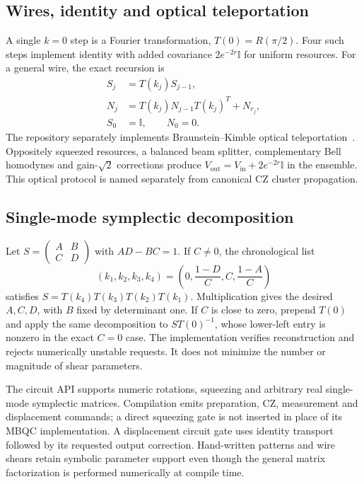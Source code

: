 \documentclass[a4paper,twocolumn,11pt,nopdfoutputerror]{quantumarticle}
\newcommand{\I}{\mathbb{I}}
\begin{document}
\subsection{Wires, identity and optical teleportation}

A single $k=0$ step is a Fourier transformation, $T(0)=R(\pi/2)$.
Four such steps implement identity with added covariance $2e^{-2r}\I$ for
uniform resources. For a general wire, the exact recursion is
\begin{align}
 S_j&=T(k_j)S_{j-1},\\
 N_j&=T(k_j)N_{j-1}T(k_j)^T+N_{r_j},\\
 S_0&=\I,\qquad N_0=0.
 \label{eq:noise}
\end{align}
The repository separately implements Braunstein--Kimble optical
teleportation~\cite{bk1998}. Oppositely squeezed resources, a balanced beam
splitter, complementary Bell homodynes and gain-$\sqrt2$ corrections produce
$V_{\mathrm{out}}=V_{\mathrm{in}}+2e^{-2r}\I$ in the ensemble. This optical
protocol is named separately from canonical CZ cluster propagation.

\subsection{Single-mode symplectic decomposition}

Let $S=\left(\begin{smallmatrix}A&B\\C&D\end{smallmatrix}\right)$ with
$AD-BC=1$. If $C\ne0$, the chronological list
\begin{equation}
 (k_1,k_2,k_3,k_4)=\left(0,\frac{1-D}{C},C,\frac{1-A}{C}\right)
 \label{eq:decomp}
\end{equation}
satisfies $S=T(k_4)T(k_3)T(k_2)T(k_1)$.
Multiplication gives the desired $A,C,D$, with $B$ fixed by determinant one.
If $C$ is close to zero, prepend $T(0)$ and apply the same decomposition to
$ST(0)^{-1}$, whose lower-left entry is nonzero in the exact $C=0$ case.
The implementation verifies reconstruction and rejects numerically unstable
requests. It does not minimize the number or magnitude of shear parameters.

The circuit API supports numeric rotations, squeezing and arbitrary real
single-mode symplectic matrices. Compilation emits preparation, CZ, measurement
and displacement commands; a direct squeezing gate is not inserted in place of
its MBQC implementation. A displacement circuit gate uses identity transport
followed by its requested output correction. Hand-written patterns and wire
shears retain symbolic parameter support even though the general matrix
factorization is performed numerically at compile time.
\end{document}
